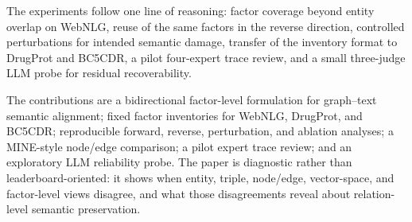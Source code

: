 The experiments follow one line of reasoning: factor coverage beyond entity overlap on WebNLG, reuse of the same factors in the reverse direction, controlled perturbations for intended semantic damage, transfer of the inventory format to DrugProt and BC5CDR, a pilot four-expert trace review, and a small three-judge LLM probe for residual recoverability.

The contributions are a bidirectional factor-level formulation for graph--text semantic alignment; fixed factor inventories for WebNLG, DrugProt, and BC5CDR; reproducible forward, reverse, perturbation, and ablation analyses; a MINE-style node/edge comparison; a pilot expert trace review; and an exploratory LLM reliability probe. The paper is diagnostic rather than leaderboard-oriented: it shows when entity, triple, node/edge, vector-space, and factor-level views disagree, and what those disagreements reveal about relation-level semantic preservation.
